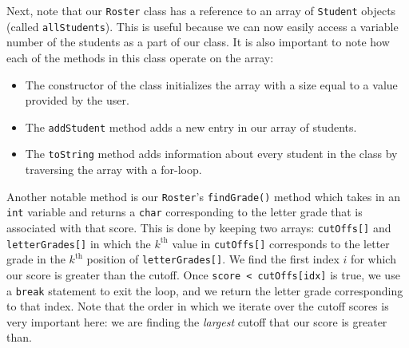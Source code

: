 Next, note that our \verb!Roster! class has a reference to an array of \verb!Student! objects (called \verb!allStudents!). This is useful because we can now easily access a variable number of the students as a part of our class. It is also important to note how each of the methods in this class operate on the array:

\begin{itemize}
    \item The constructor of the class initializes the array with a size equal to a value provided by the user. 
    \item The \verb!addStudent! method adds a new entry in our array of students.
    \item The \verb!toString! method adds information about every student in the class by traversing the array with a for-loop. 
\end{itemize}

Another notable method is our \verb!Roster!'s \verb!findGrade()! method which takes in an \verb!int! variable and returns a \verb!char! corresponding to the letter grade that is associated with that score. This is done by keeping two arrays: \verb!cutOffs[]! and \verb!letterGrades[]! in which the $k^{\text{th}}$ value in \verb!cutOffs[]! corresponds to the letter grade in the $k^{\text{th}}$ position of \verb!letterGrades[]!. We find the first index $i$ for which our score is greater than the cutoff. Once \verb!score < cutOffs[idx]! is true, we use a \verb!break! statement to exit the loop, and we return the letter grade corresponding to that index. Note that the order in which we iterate over the cutoff scores is very important here: we are finding the \textit{largest} cutoff that our score is greater than. 